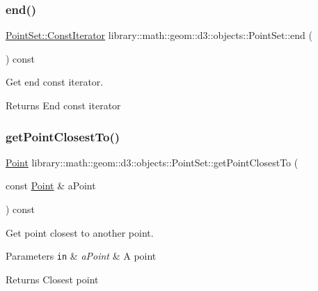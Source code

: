\subsubsection{\texorpdfstring{end()}{end()}}
{\footnotesize\ttfamily \hyperlink{classlibrary_1_1math_1_1geom_1_1d3_1_1objects_1_1_point_set_a7b7fade95484b653ec27ad082ffc8064}{Point\+Set\+::\+Const\+Iterator} library\+::math\+::geom\+::d3\+::objects\+::\+Point\+Set\+::end (\begin{DoxyParamCaption}{ }\end{DoxyParamCaption}) const}



Get end const iterator. 

\begin{DoxyReturn}{Returns}
End const iterator 
\end{DoxyReturn}
\mbox{\label{classlibrary_1_1math_1_1geom_1_1d3_1_1objects_1_1_point_set_a0f2fa4053eec2d5c82cc5b72fb59f1e1}} 
\subsubsection{\texorpdfstring{get\+Point\+Closest\+To()}{getPointClosestTo()}}
{\footnotesize\ttfamily \hyperlink{classlibrary_1_1math_1_1geom_1_1d3_1_1objects_1_1_point}{Point} library\+::math\+::geom\+::d3\+::objects\+::\+Point\+Set\+::get\+Point\+Closest\+To (\begin{DoxyParamCaption}\item[{const \hyperlink{classlibrary_1_1math_1_1geom_1_1d3_1_1objects_1_1_point}{Point} \&}]{a\+Point }\end{DoxyParamCaption}) const}



Get point closest to another point. 


\begin{DoxyParams}[1]{Parameters}
\mbox{\tt in}  & {\em a\+Point} & A point \\
\hline
\end{DoxyParams}
\begin{DoxyReturn}{Returns}
Closest point 
\end{DoxyReturn}
\mbox{\label{classlibrary_1_1math_1_1geom_1_1d3_1_1objects_1_1_point_set_ae112a693107884e5d227bfb99f684fea}} 
